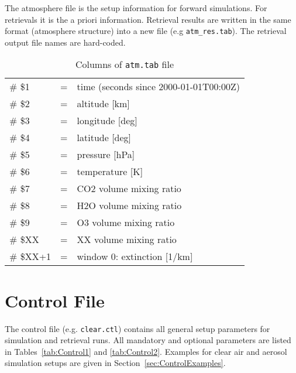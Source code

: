 The atmosphere file is the setup information for forward simulations. For retrievals it is the a priori information. Retrieval results are written in the same format (atmosphere structure) into a new file (e.g \texttt{atm\_res.tab}). The retrieval output file names are hard-coded.

\begin{table*}[!h]
\caption{Columns of \texttt{atm.tab} file}
\begin{tabular}{lcl}
\# \$1 & = & time (seconds since 2000-01-01T00:00Z) \\
\# \$2 & = & altitude [km] \\
\# \$3 & = & longitude [deg] \\
\# \$4 & = & latitude [deg] \\
\# \$5 & = & pressure [hPa] \\
\# \$6 & = & temperature [K] \\
\# \$7 & = & CO2 volume mixing ratio \\
\# \$8 & = & H2O volume mixing ratio \\
\# \$9 & = & O3 volume mixing ratio \\
\# \$XX   & = & XX volume mixing ratio \\
\# \$XX+1 & = & window 0: extinction [1/km] \\
\end{tabular}
\end{table*} 


\section{Control File}
\label{sec:ControlFile}
The control file (e.g. \texttt{clear.ctl}) contains all general setup parameters for simulation and retrieval runs. All mandatory and optional parameters are listed in Tables~\ref{tab:Control1} and \ref{tab:Control2}. Examples for clear air and aerosol simulation setups are given in Section~\ref{sec:ControlExamples}.

